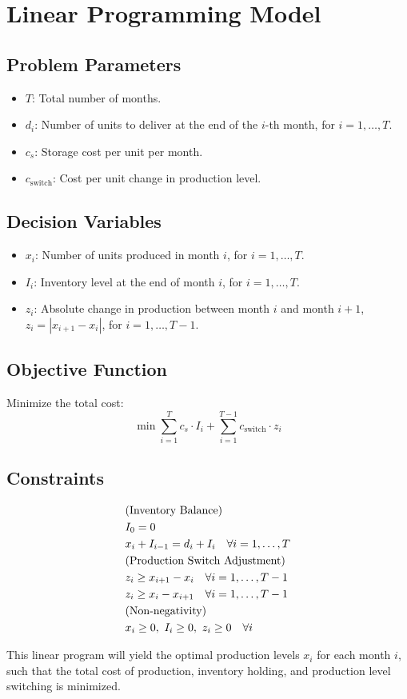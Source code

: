 \documentclass{article}
\begin{document}
\section*{Linear Programming Model}

\subsection*{Problem Parameters}

\begin{itemize}
    \item $T$: Total number of months.
    \item $d_i$: Number of units to deliver at the end of the $i$-th month, for $i = 1, \ldots, T$.
    \item $c_s$: Storage cost per unit per month.
    \item $c_{\text{switch}}$: Cost per unit change in production level.
\end{itemize}

\subsection*{Decision Variables}

\begin{itemize}
    \item $x_i$: Number of units produced in month $i$, for $i = 1, \ldots, T$.
    \item $I_i$: Inventory level at the end of month $i$, for $i = 1, \ldots, T$.
    \item $z_i$: Absolute change in production between month $i$ and month $i+1$, $z_i = |x_{i+1} - x_i|$, for $i = 1, \ldots, T-1$.
\end{itemize}

\subsection*{Objective Function}

Minimize the total cost:
\[
\min \sum_{i=1}^{T} c_s \cdot I_i + \sum_{i=1}^{T-1} c_{\text{switch}} \cdot z_i
\]

\subsection*{Constraints}

\begin{align}
    & \text{(Inventory Balance)} \notag \\
    & I_0 = 0 \\
    & x_i + I_{i-1} = d_i + I_i \quad \forall i = 1, \ldots, T \\    
    & \text{(Production Switch Adjustment)} \notag \\
    & z_i \geq x_{i+1} - x_i \quad \forall i = 1, \ldots, T-1 \\
    & z_i \geq x_i - x_{i+1} \quad \forall i = 1, \ldots, T-1 \\
    & \text{(Non-negativity)} \notag \\
    & x_i \geq 0, \ I_i \geq 0, \ z_i \geq 0 \quad \forall i
\end{align}

This linear program will yield the optimal production levels $x_i$ for each month $i$, such that the total cost of production, inventory holding, and production level switching is minimized.
\end{document}
